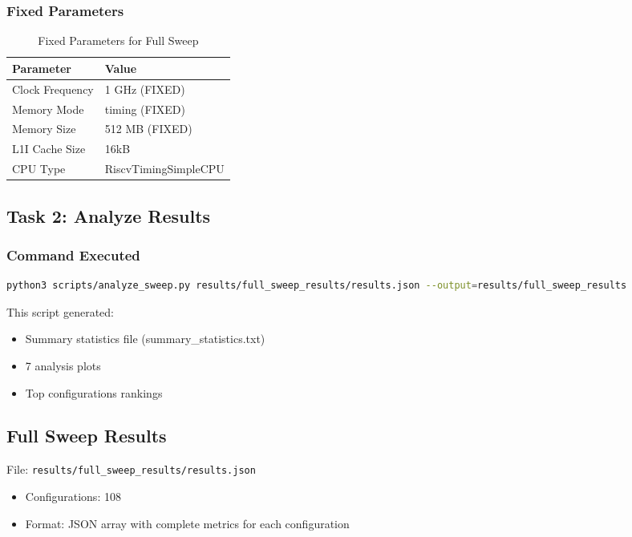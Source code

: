 \documentclass[11pt,a4paper]{article}
\begin{document}
\subsubsection{Fixed Parameters}

\begin{table}[H]
\centering
\caption{Fixed Parameters for Full Sweep}
\begin{tabular}{ll}
\toprule
\textbf{Parameter} & \textbf{Value} \\
\midrule
Clock Frequency & 1 GHz (FIXED) \\
Memory Mode & timing (FIXED) \\
Memory Size & 512 MB (FIXED) \\
L1I Cache Size & 16kB \\
CPU Type & RiscvTimingSimpleCPU \\
\bottomrule
\end{tabular}
\end{table}

\subsection{Task 2: Analyze Results}

\subsubsection{Command Executed}

\begin{lstlisting}[language=bash]
python3 scripts/analyze_sweep.py results/full_sweep_results/results.json --output=results/full_sweep_results
\end{lstlisting}

This script generated:
\begin{itemize}[noitemsep]
    \item Summary statistics file (summary\_statistics.txt)
    \item 7 analysis plots 
    \item Top configurations rankings
\end{itemize}

\subsection{Full Sweep Results}

File: \texttt{results/full\_sweep\_results/results.json}

\begin{itemize}[noitemsep]
    \item Configurations: 108
    \item Format: JSON array with complete metrics for each configuration
\end{itemize}
\end{document}
